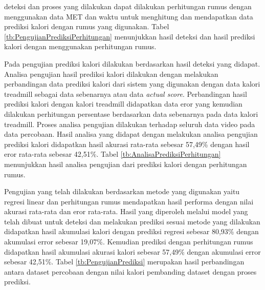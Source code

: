 \noindent
deteksi dan proses yang dilakukan dapat dilakukan perhitungan rumus dengan menggunakan data MET dan waktu untuk menghitung dan mendapatkan data prediksi kalori dengan rumus yang digunakan. Tabel \ref{tb:PengujianPrediksiPerhitungan} menunjukkan hasil deteksi dan hasil prediksi kalori dengan menggunakan perhitungan rumus.



Pada pengujian prediksi kalori dilakukan berdasarkan hasil deteksi yang didapat. Analisa pengujian hasil prediksi kalori dilakukan dengan melakukan perbandingan data prediksi kalori dari sistem yang digunakan dengan data kalori treadmill sebagai data sebenarnya atau data \emph{actual score}. Perbandingan hasil prediksi kalori dengan kalori treadmill didapatkan data eror yang kemudian dilakukan perhitungan persentase berdasarkan data sebenarnya pada data kalori treadmill. Proses analisa pengujian dilakukan terhadap seluruh data video pada data percobaan. Hasil analisa yang didapat dengan melakukan analisa pengujian prediksi kalori didapatkan hasil akurasi rata-rata sebesar 57,49\% dengan hasil eror rata-rata sebesar 42,51\%. Tabel \ref{tb:AnalisaPrediksiPerhitungan} menunjukkan hasil analisa pengujian dari prediksi kalori dengan perhitungan rumus.

Pengujian yang telah dilakukan berdasarkan metode yang digunakan yaitu regresi linear dan perhitungan rumus mendapatkan hasil performa dengan nilai akurasi rata-rata dan eror rata-rata. Hasil yang diperoleh melalui model yang telah dibuat untuk deteksi dan melakukan prediksi sesuai metode yang dilakukan didapatkan hasil akumulasi kalori dengan prediksi regresi sebesar 80,93\% dengan akumulasi error sebesar 19,07\%. Kemudian prediksi dengan perhitungan rumus didapatkan hasil akumulasi akurasi kalori sebesar 57,49\% dengan akumulasi error sebesar 42,51\%. Tabel \ref{tb:PengujianPrediksi} merupakan hasil perbandingan antara dataset percobaan dengan nilai kalori pembanding dataset dengan proses prediksi.

